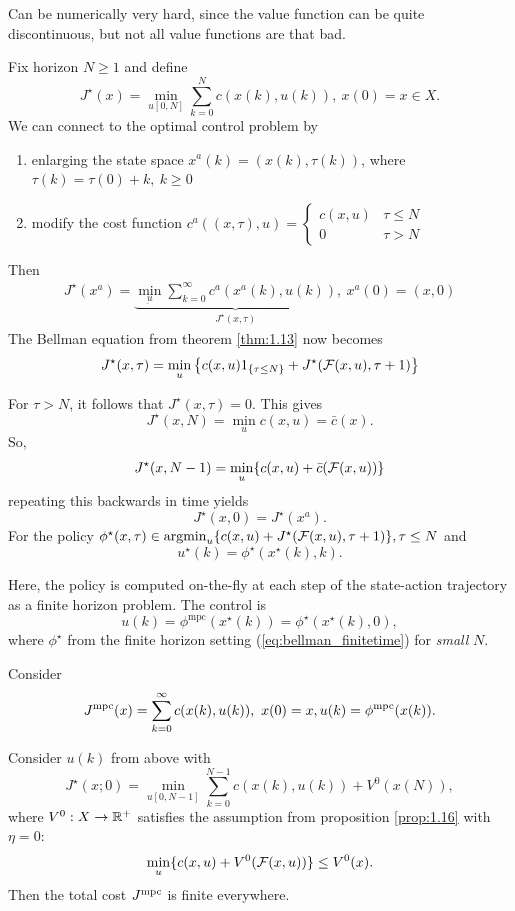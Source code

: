 Can be numerically very hard, since the value function can be quite discontinuous, but not all value functions are that bad.

 Fix horizon \(N\geq 1\) and define 
\[J^\star(x)=\min_{u[0,N]}\sum_{k=0}^N c(x(k),u(k)),\ x(0)=x\in X.\]
We can connect to the optimal control problem by 
\begin{enumerate}
    \item enlarging the state space \(x^a(k)=(x(k),\tau(k))\), where \(\tau(k)=\tau(0)+k,\ k\geq 0\)
    \item modify the cost function \(c^a((x,\tau),u)=\begin{cases}
        c(x,u) & \tau \leq N\\
        0 & \tau >N
    \end{cases}\)
\end{enumerate}
Then 
\begin{align*}
    J^\star(x^a)=\underbrace{\min_{\underbar{u}}\sum_{k=0}^\infty c^a(x^a(k),u(k))}_{J^\star(x,\tau)},\ x^a(0)=(x,0)
\end{align*}
The Bellman equation from theorem \ref{thm:1.13} now becomes 
\begin{equation}\label{eq:bellman_finitetime}
    J^\star(x,\tau)=\min_u\left\{c(x,u)1_{\{\tau \leq N\}}+J^\star(\mathcal{F}(x,u),\tau+1)\right\}
\end{equation}

For \(\tau>N\), it follows that \(J^\star(x,\tau)=0\).
This gives 
\[J^\star(x,N)=\min_{u}c(x,u)=\bar{c}(x).\]
So, \[J^\star(x,N-1)=\min_{u}\{c(x,u)+\bar{c}(\mathcal{F}(x,u))\}\]
repeating this backwards in time yields 
\[J^\star(x,0)=J^\star(x^a).\]
For the policy \(\phi^\star(x,\tau)\in \operatorname*{\text{argmin}}_{u}\{c(x,u)+J^\star(\mathcal{F}(x,u),\tau+1)\},\tau \leq N\)
and \[u^\star(k)=\phi^\star(x^\star(k),k).\]


Here, the policy is computed on-the-fly at 
each step of the state-action trajectory as a finite horizon 
problem. 
The control is 
\[u(k)=\phi^{\text{mpc}}(x^\star(k))=\phi^\star(x^\star(k),0),\]
where \(\phi^\star\) from the finite horizon setting (\ref{eq:bellman_finitetime})
for \textit{small} \(N\).

Consider 
\[J{^{\text{mpc}}}(x)=\sum_{k=0}^\infty c(x(k),u(k)),\ x(0)=x,u(k)=\phi{^{\text{mpc}}}(x(k)).\]

\begin{proposition}\label{prop:1.19}
    Consider \(u(k)\) from above with 
    \[J^\star(x;0)=\min_{u[0,N-1]}\sum_{k=0}^{N-1}c(x(k),u(k))+V^0(x(N)),\]
    where \(V^0:X\to\mathbb{R}^+\) satisfies the assumption from proposition \ref{prop:1.16}
    with \(\eta=0\):
    \[\min_{u}\{c(x,u)+V^0(\mathcal{F}(x,u))\}\leq V^0(x).\]
    Then the total cost \(J{^{\text{mpc}}}\) is finite everywhere.
\end{proposition}

